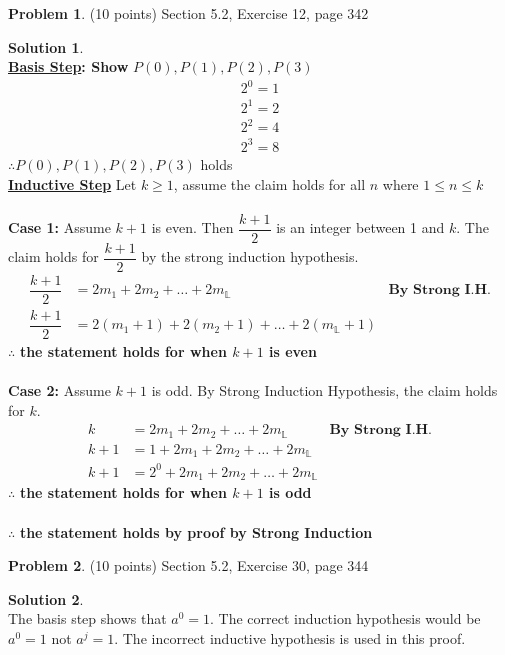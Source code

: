 \documentclass{article}
\theoremstyle{definition}
\newtheorem{problem}{Problem}
\newtheorem*{solution}{Solution}
\begin{document}
\begin{problem} (10 points)
Section 5.2, Exercise 12, page 342
\end{problem}
\begin{solution} \ \\
\textbf{\underline{Basis Step}: Show }$P(0), P(1), P(2), P(3)$ \\
\begin{align*}
2^0 = 1 \\
2^1 = 2 \\
2^2 = 4 \\
2^3 = 8
\end{align*}
$\therefore P(0), P(1), P(2), P(3)$ holds \\
\textbf{\underline{Inductive Step}} Let $k \ge 1$, assume the claim holds for all $n$ where $1 \le n \le k$ \\ \ \\
\textbf{Case 1:} Assume $k+1$ is even. Then $\dfrac{k+1}{2}$ is an integer between 1 and $k$. The claim holds for $\dfrac{k+1}{2}$ by the strong induction hypothesis.
\begin{align*}
\dfrac{k+1}{2} &= 2m_1 + 2m_2 + \dots + 2 m_{\mathbb{L}} &\textbf{By Strong I.H.} \\
\dfrac{k+1}{2} &= 2(m_1 + 1) + 2(m_2+1) + \dots + 2 (m_{\mathbb{L}} + 1)
\end{align*}
$\therefore$ \textbf{the statement holds for when $k+1$ is even} \\ \ \\
\textbf{Case 2:} Assume $k+1$ is odd. By Strong Induction Hypothesis, the claim holds for $k$.
\begin{align*}
  k  &= 2m_1 + 2m_2 + \dots + 2 m_{\mathbb{L}} &\textbf{By Strong I.H.} \\
  k + 1 &= 1 + 2m_1 + 2m_2 + \dots + 2 m_{\mathbb{L}} \\
  k + 1 &= 2^0 + 2m_1 + 2m_2 + \dots + 2 m_{\mathbb{L}}
\end{align*}
$\therefore$ \textbf{the statement holds for when $k+1$ is odd} \\ \ \\
$\therefore$ \textbf{the statement holds by proof by Strong Induction}
\end{solution}

\begin{problem} (10 points)
Section 5.2, Exercise 30, page 344
\end{problem}
\begin{solution}\ \\
The basis step shows that $a^0 = 1$. The correct induction hypothesis would be $a^0 = 1$ not $a^j = 1$. The incorrect inductive hypothesis is used in this proof.
\end{solution}
\end{document}
